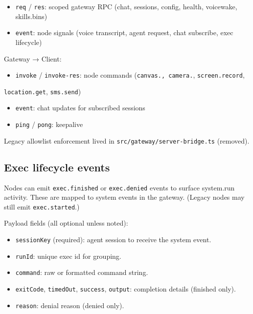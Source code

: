 \begin{itemize}
  \item \texttt{req} / \texttt{res}: scoped gateway RPC (chat, sessions, config, health, voicewake, skills.bins)
  \item \texttt{event}: node signals (voice transcript, agent request, chat subscribe, exec lifecycle)
\end{itemize}


Gateway → Client:

\begin{itemize}
  \item \texttt{invoke} / \texttt{invoke-res}: node commands (\texttt{canvas.\textit{}, \texttt{camera.}}, \texttt{screen.record},
\end{itemize}

\texttt{location.get}, \texttt{sms.send})
\begin{itemize}
  \item \texttt{event}: chat updates for subscribed sessions
  \item \texttt{ping} / \texttt{pong}: keepalive
\end{itemize}


Legacy allowlist enforcement lived in \texttt{src/gateway/server-bridge.ts} (removed).

\subsection{Exec lifecycle events}


Nodes can emit \texttt{exec.finished} or \texttt{exec.denied} events to surface system.run activity.
These are mapped to system events in the gateway. (Legacy nodes may still emit \texttt{exec.started}.)

Payload fields (all optional unless noted):

\begin{itemize}
  \item \texttt{sessionKey} (required): agent session to receive the system event.
  \item \texttt{runId}: unique exec id for grouping.
  \item \texttt{command}: raw or formatted command string.
  \item \texttt{exitCode}, \texttt{timedOut}, \texttt{success}, \texttt{output}: completion details (finished only).
  \item \texttt{reason}: denial reason (denied only).
\end{itemize}


